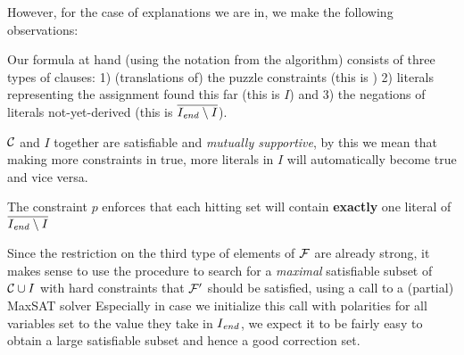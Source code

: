 However, for the case of explanations we are in, we make the following observations: 
\begin{compactitem}
 \item Our formula at hand (using the notation from the \onestepo algorithm) consists of three types of clauses: 1) (translations of) the puzzle constraints (this is \formulac) 2) literals representing the assignment found this far (this is $I$) and 3) the negations of literals not-yet-derived (this is $\overline{I_\mathit{end} \setminus I}$). 
 \item $\mathcal{C} $ and $I$ together are satisfiable and \emph{mutually supportive}, by this we mean that making more constraints in \formulac true, more literals in $I$ will automatically become true and vice versa. 
 \item The constraint $p$ enforces that each hitting set will contain \textbf{exactly} one literal of  $\overline{I_\mathit{end} \setminus I}$
\end{compactitem}
Since the restriction on the third type of elements of $\mathcal{F} $ are already strong, it makes sense to use the \grow procedure to search for a \emph{maximal} satisfiable subset of $\mathcal{C} \cup I$ with hard constraints that $\mathcal{F} '$ should be satisfied, using a call to a  (partial) MaxSAT solver Especially in case we initialize this call with  polarities for all variables set to the value they take in $I_\mathit{end} $, we expect it to be fairly easy to obtain a large satisfiable subset and hence a good correction set. 






